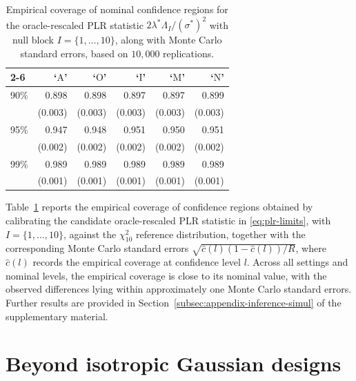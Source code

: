 \documentclass{article}
\theoremstyle{definition}
\begin{document}
\begin{bibunit}
\begin{table}[H]
\begin{tabular}{@{}lrrrrr@{}}
\cmidrule(l){2-6}
 & `$\mathrm{A}$' & `$\mathrm{O}$' & `$\mathrm{I}$' & `$\mathrm{M}$' & `$\mathrm{N}$' \\
\midrule
90\% & 0.898 & 0.898 & 0.897 & 0.897 & 0.899 \\[-2pt]
 & (0.003) & (0.003) & (0.003) & (0.003) & (0.003) \\
95\% & 0.947 & 0.948 & 0.951 & 0.950 & 0.951 \\[-2pt]
 & (0.002) & (0.002) & (0.002) & (0.002) & (0.002) \\
99\% & 0.989 & 0.989 & 0.989 & 0.989 & 0.989 \\[-2pt]
 & (0.001) & (0.001) & (0.001) & (0.001) & (0.001) \\
\bottomrule
\end{tabular}
\caption{Empirical coverage of nominal
confidence regions for the oracle-rescaled PLR statistic $2\lambda^*\Lambda_I/(\sigma^*)^2$ with null block $I=\{1,\ldots,10\}$, 
along with Monte Carlo standard errors, based on $10{,}000$ replications.}
\label{tab:inference-plr-coverage}
\end{table}
\noindent
Table~\ref{tab:inference-plr-coverage} reports the empirical coverage of
confidence regions obtained by calibrating the candidate oracle-rescaled PLR
statistic in \eqref{eq:plr-limits}, with
$I=\{1,\ldots,10\}$, against the $\chi_{10}^2$ reference distribution,
together with the corresponding Monte Carlo standard errors $\sqrt{\hat c(l) (1 - \hat c(l)) / R}$, where $\hat c(l)$
records the empirical coverage at confidence level $l$.
Across all settings and nominal levels, the empirical coverage is close to
its nominal value, with the observed differences lying within approximately
one Monte Carlo standard errors.
Further results are provided in
Section~\ref{subsec:appendix-inference-simul} of the supplementary material.



\section{Beyond isotropic Gaussian designs} 
\label{sec:beyond-isotropic} 


\end{bibunit}
\end{document}
